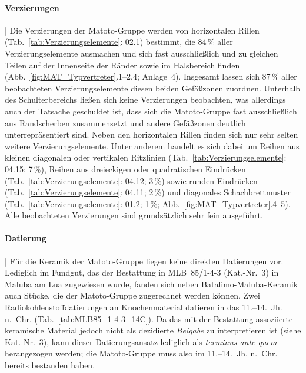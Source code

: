 \paragraph{Verzierungen}\hspace{-.5em}|\hspace{.5em}%
Die Verzierungen der Matoto-Gruppe werden von horizontalen Rillen (Tab.~\ref{tab:Verzierungselemente}: 02.1) bestimmt, die 84\,\% aller Verzierungselemente ausmachen und sich fast ausschließlich und zu gleichen Teilen auf der Innenseite der Ränder sowie im Halsbereich finden (Abb.~\ref{fig:MAT_Typvertreter}.1--2,4; Anlage~4). Insgesamt lassen sich 87\,\% aller beobachteten Verzierungselemente diesen beiden Gefäßzonen zuordnen. Unterhalb des Schulterbereichs ließen sich keine Verzierungen beobachten, was allerdings auch der Tatsache geschuldet ist, dass sich die Matoto-Gruppe fast ausschließlich aus Randscherben zusammensetzt und andere Gefäßzonen deutlich unterrepräsentiert sind. Neben den horizontalen Rillen finden sich nur sehr selten weitere Verzierungselemente. Unter anderem handelt es sich dabei um Reihen aus kleinen diagonalen oder vertikalen Ritzlinien (Tab.~\ref{tab:Verzierungselemente}: 04.15; 7\,\%), Reihen aus dreieckigen oder quadratischen Eindrücken (Tab.~\ref{tab:Verzierungselemente}: 04.12; 3\,\%) sowie runden Eindrücken (Tab.~\ref{tab:Verzierungselemente}: 04.11; 2\,\%) und diagonales Schachbrettmuster (Tab.~\ref{tab:Verzierungselemente}: 01.2; 1\,\%; Abb.~\ref{fig:MAT_Typvertreter}.4--5). Alle beobachteten Verzierungen sind grundsätzlich sehr fein ausgeführt.

\paragraph{Datierung}\hspace{-.5em}|\hspace{.5em}%
Für die Keramik der Matoto-Gruppe liegen keine direkten Datierungen vor. Lediglich im Fundgut, das der Bestattung in MLB~85/1-4-3 (Kat.-Nr.~3) in Maluba am Lua zugewiesen wurde, fanden sich neben Batalimo-Maluba-Keramik auch Stücke, die der Matoto-Gruppe zugerechnet werden können. Zwei Radiokohlenstoffdatierungen an Knochenmaterial datieren in das 11.--14.~Jh. n.~Chr. (Tab.~\ref{tab:MLB85_1-4-3_14C}). Da das mit der Bestattung assoziierte keramische Material jedoch nicht als dezidierte \textit{Beigabe} zu interpretieren ist (siehe Kat.-Nr.~3), kann dieser Datierungsansatz lediglich als \textit{terminus ante quem} herangezogen werden; die Matoto-Gruppe muss also im 11.--14.~Jh. n.~Chr. bereits bestanden haben.

